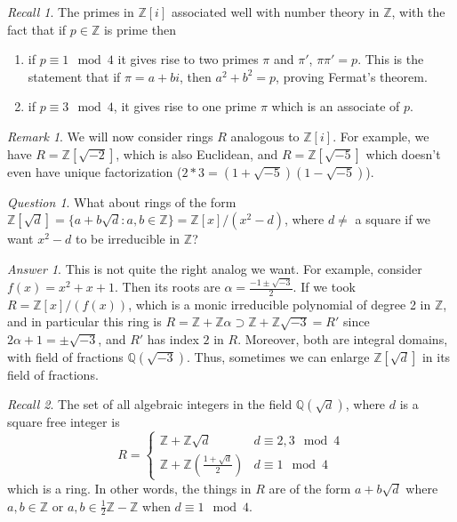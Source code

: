 \documentclass[12pt]{article}
\theoremstyle{definition}
\theoremstyle{remark}
\newtheorem{rmk}[thm]{Remark}
\newtheorem*{qst}{Question}
\newtheorem*{ans}{Answer}
\newtheorem*{rec}{Recall}
\numberwithin{equation}{section}
\newcommand\Z{\mathbb Z}    %
\newcommand\Q{\mathbb Q}    %
\begin{document}
\begin{rec}
        The primes in $\Z[i]$ associated well with number theory in $\Z$, with the fact that if $p \in \Z$ is prime then \begin{enumerate}
                \item if $p \equiv 1 \mod 4$ it gives rise to two primes $\pi$ and $\pi'$, $\pi\pi' = p$. This is the statement that if $\pi = a+bi$, then $a^2+b^2 = p$, proving Fermat's theorem.
                \item if $p \equiv 3 \mod 4$, it gives rise to one prime $\pi$ which is an associate of $p$.
        \end{enumerate}
\end{rec}

\vspace{15pt}


\begin{rmk}
        We will now consider rings $R$ analogous to $\Z[i]$. For example, we have $R = \Z[\sqrt{-2}]$, which is also Euclidean, and $R = \Z[\sqrt{-5}]$ which doesn't even have unique factorization ($2*3 = (1+\sqrt{-5})(1-\sqrt{-5})$).
\end{rmk}

\vspace{15pt}

\begin{qst}
        What about rings of the form $\Z[\sqrt{d}] = \{a+b\sqrt{d}:a,b \in \Z\} = \Z[x]/(x^2-d)$, where $d \neq$ a square if we want $x^2-d$ to be irreducible in $\Z$?
\end{qst}
\begin{ans}
        This is not quite the right analog we want. For example, consider $f(x) = x^2 + x +1$. Then its roots are $\alpha = \frac{-1\pm \sqrt{-3}}{2}$. If we took $R = \Z[x]/(f(x))$, which is a monic irreducible polynomial of degree 2 in $\Z$, and in particular this ring is $R = \Z+\Z \alpha \supset \Z+\Z\sqrt{-3} = R'$ since $2\alpha + 1 = \pm \sqrt{-3}$, and $R'$ has index $2$ in $R$. Moreover, both are integral domains, with field of fractions $\Q(\sqrt{-3})$. Thus, sometimes we can enlarge $\Z[\sqrt{d}]$ in its field of fractions. 
\end{ans}

\vspace{15pt}


\begin{rec}
        The set of all algebraic integers in the field $\Q(\sqrt{d})$, where $d$ is a square free integer is \begin{equation}
                R = \left\{\begin{array}{cc} \Z+\Z\sqrt{d} & d\equiv 2,3 \mod 4 \\ \Z+\Z\left(\frac{1+\sqrt{d}}{2}\right) & d \equiv 1 \mod 4 \end{array}\right.
        \end{equation}
        which is a ring. In other words, the things in $R$ are of the form $a+b\sqrt{d}$ where $a,b \in \Z$ or $a,b \in \frac{1}{2}\Z-\Z$ when $d \equiv 1 \mod 4$.
\end{rec}
\end{document}
